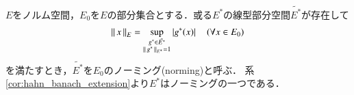 	\begin{screen}
		\begin{dfn}[ノーミング]
			$E$をノルム空間，$E_0$を$E$の部分集合とする．或る$E^*$の線型部分空間$\tilde{E^*}$が存在して
			\begin{align}
				\left\|\, x\, \right\|_{E} = \operatorname*{sup}_{\substack{g^* \in \tilde{E^*} \\ \left\|\, g^*\, \right\|_{E^*} = 1}} \left| g^*(x) \right|
				\quad (\forall x \in E_0)
			\end{align}
			を満たすとき，$\tilde{E^*}$を$E_0$のノーミング(norming)と呼ぶ．
			系\ref{cor:hahn_banach_extension}より$E^*$はノーミングの一つである．
		\end{dfn}
	\end{screen}
	
	\begin{screen}
		\begin{lem}[単位球面上にノーミングが存在する] 
			
		\end{lem}
	\end{screen}
	